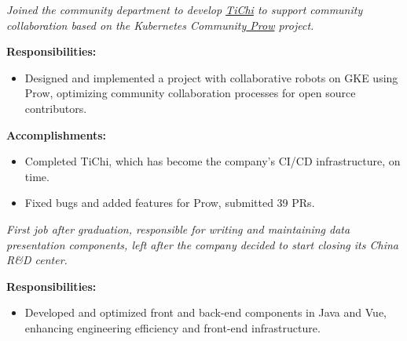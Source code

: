 \documentclass{software_engineer_rustin_liu}
\newcommand{\en}[1]{#1}
\newcommand{\zh}[1]{}
\begin{document}
\en{}
\zh{\datedsubsection{\textbf{\href{https://pingcap.com/zh/}{PingCAP Inc. - 数据库 - 前后端开发工程师（Golang/JS）}}}{2020/08 -- 2021/07}}
\en{\textsl{Joined the community department to develop {\href{https://github.com/ti-community-infra/tichi}{TiChi}} to support community collaboration based on the Kubernetes Community{\href{https://github.com/kubernetes/test-infra/tree/master/prow}{ Prow}} project.}}
\zh{\textsl{加入了社区部门，以 Kubernetes 社区{\href{https://github.com/kubernetes/test-infra/tree/master/prow}{ Prow}} 项目为基础开发{\href{https://github.com/ti-community-infra/tichi}{ TiChi}} 来支撑社区协作。}}

\en{\textbf{Responsibilities:}}
\zh{\textbf{职责：}}
\begin{itemize}
      \item \en{Designed and implemented a project with collaborative robots on GKE using Prow, optimizing community collaboration processes for open source contributors.}
            \zh{使用 Prow 在 GKE 上设计和实现一个协作机器人项目，优化开源贡献者的社区协作流程。}
\end{itemize}

\en{\textbf{Accomplishments:}}
\zh{\textbf{产出：}}
\begin{itemize}
      \item \en{Completed TiChi, which has become the company's CI/CD infrastructure, on time.}
            \zh{按时完成了项目的设计和开发，TiChi 已经成为了公司 CI/CD 的基础设施。}
      \item \en{Fixed bugs and added features for Prow, submitted 39 PRs.}
            \zh{为 Prow 修复 bug 和添加功能，提交了 39 个 PR。}
\end{itemize}

\en{}
\zh{\datedsubsection{\textbf{\href{https://www.morningstar.com/}{晨星资讯（Morningstar, Inc.）- 金融服务 - 前后端开发工程师（Java/JS）}}}{2019/06 -- 2020/07}}
\en{\textsl{First job after graduation, responsible for writing and maintaining data presentation components, left after the company decided to start closing its China R\&D center.}}
\zh{\textsl{毕业后第一份工作，负责编写和维护数据展示组件，在公司决定开始关闭中国研发中心后离职。}}

\en{\textbf{Responsibilities:}}
\zh{\textbf{职责：}}
\begin{itemize}
      \item \en{Developed and optimized front and back-end components in Java and Vue, enhancing engineering efficiency and front-end infrastructure.}
            \zh{使用 Java 和 Vue 开发和优化前后端组件，提升工程效率和前端基础设施。}
\end{itemize}
\end{document}
